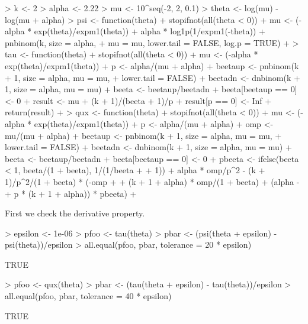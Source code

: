 \documentclass[11pt]{article}
\begin{document}
\begin{Schunk}
\begin{Sinput}
> k <- 2
> alpha <- 2.22
> mu <- 10^seq(-2, 2, 0.1)
> theta <- log(mu) - log(mu + alpha)
> psi <- function(theta) {
+     stopifnot(all(theta < 0))
+     mu <- (-alpha * exp(theta)/expm1(theta))
+     alpha * log1p(1/expm1(-theta)) + pnbinom(k, size = alpha, 
+         mu = mu, lower.tail = FALSE, log.p = TRUE)
+ }
> tau <- function(theta) {
+     stopifnot(all(theta < 0))
+     mu <- (-alpha * exp(theta)/expm1(theta))
+     p <- alpha/(mu + alpha)
+     beetaup <- pnbinom(k + 1, size = alpha, mu = mu, 
+         lower.tail = FALSE)
+     beetadn <- dnbinom(k + 1, size = alpha, mu = mu)
+     beeta <- beetaup/beetadn
+     beeta[beetaup == 0] <- 0
+     result <- mu + (k + 1)/(beeta + 1)/p
+     result[p == 0] <- Inf
+     return(result)
+ }
> qux <- function(theta) {
+     stopifnot(all(theta < 0))
+     mu <- (-alpha * exp(theta)/expm1(theta))
+     p <- alpha/(mu + alpha)
+     omp <- mu/(mu + alpha)
+     beetaup <- pnbinom(k + 1, size = alpha, mu = mu, 
+         lower.tail = FALSE)
+     beetadn <- dnbinom(k + 1, size = alpha, mu = mu)
+     beeta <- beetaup/beetadn
+     beeta[beetaup == 0] <- 0
+     pbeeta <- ifelse(beeta < 1, beeta/(1 + beeta), 1/(1/beeta + 
+         1))
+     alpha * omp/p^2 - (k + 1)/p^2/(1 + beeta) * (-omp + 
+         (k + 1 + alpha) * omp/(1 + beeta) + (alpha - 
+         p * (k + 1 + alpha)) * pbeeta)
+ }
\end{Sinput}
\end{Schunk}

First we check the derivative property.
\begin{Schunk}
\begin{Sinput}
> epsilon <- 1e-06
> pfoo <- tau(theta)
> pbar <- (psi(theta + epsilon) - psi(theta))/epsilon
> all.equal(pfoo, pbar, tolerance = 20 * epsilon)
\end{Sinput}
\begin{Soutput}
[1] TRUE
\end{Soutput}
\begin{Sinput}
> pfoo <- qux(theta)
> pbar <- (tau(theta + epsilon) - tau(theta))/epsilon
> all.equal(pfoo, pbar, tolerance = 40 * epsilon)
\end{Sinput}
\begin{Soutput}
[1] TRUE
\end{Soutput}
\end{Schunk}
\end{document}
